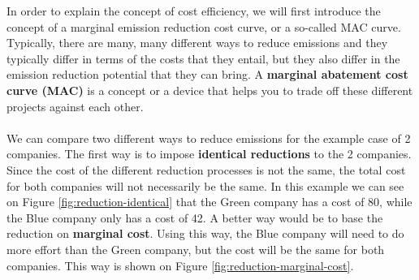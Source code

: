 \documentclass[../summary.tex]{subfiles}
\begin{document}
	  In order to explain the concept of cost efficiency, we will first introduce the concept of a marginal emission reduction cost curve, or a so-called MAC curve. Typically, there are many, many different ways to reduce emissions and they typically differ in terms of the costs that they entail, but they also differ in the emission reduction potential that they can bring. A \textbf{marginal abatement cost curve (MAC)} is a concept or a device that helps you to trade off these different projects against each other.
	  \\\\
	  We can compare two different ways to reduce emissions for the example case of 2 companies. The first way is to impose \textbf{identical reductions} to the 2 companies. Since the cost of the different reduction processes is not the same, the total cost for both companies will not necessarily be the same. In this example we can see on Figure \ref{fig:reduction-identical} that the Green company has a cost of 80, while the Blue company only has a cost of 42. A better way would be to base the reduction on \textbf{marginal cost}. Using this way, the Blue company will need to do more effort than the Green company, but the cost will be the same for both companies. This way is shown on Figure \ref{fig:reduction-marginal-cost}.
	  
\end{document}
